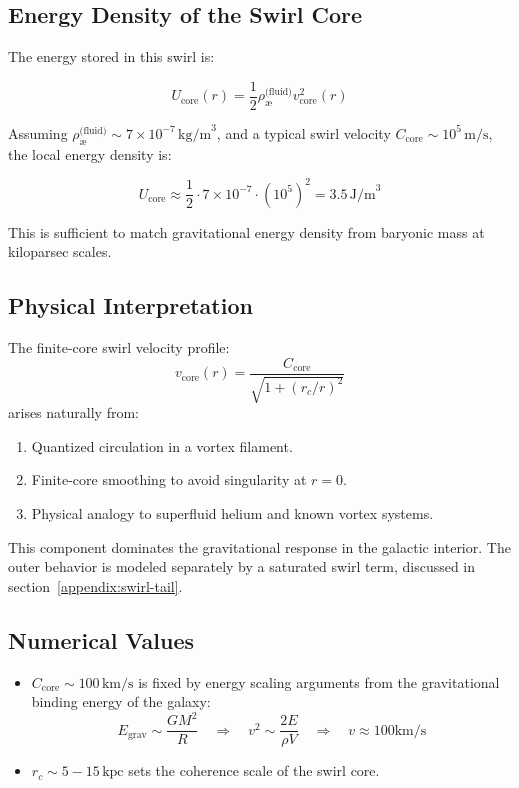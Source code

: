 \documentclass[12pt]{article}
\begin{document}
\subsection{Energy Density of the Swirl Core}

The energy stored in this swirl is:

\[
U_{\text{core}}(r) = \frac{1}{2} \rho_{\text{\ae}}^{\text{(fluid)}} v_\text{core}^2(r)
\]

Assuming \( \rho_{\text{\ae}}^{\text{(fluid)}} \sim 7 \times 10^{-7}\, \text{kg/m}^3 \), and a typical swirl velocity \( C_{\text{core}} \sim 10^5\, \text{m/s} \), the local energy density is:

\[
U_{\text{core}} \approx \frac{1}{2} \cdot 7 \times 10^{-7} \cdot (10^5)^2 = 3.5\, \text{J/m}^3
\]

This is sufficient to match gravitational energy density from baryonic mass at kiloparsec scales.

\subsection{Physical Interpretation}

The finite-core swirl velocity profile:
\[
\boxed{
v_\text{core}(r) = \frac{C_{\text{core}}}{\sqrt{1 + (r_c/r)^2}}
}
\]
arises naturally from:
\begin{enumerate}
    \item Quantized circulation in a vortex filament.
    \item Finite-core smoothing to avoid singularity at \( r = 0 \).
    \item Physical analogy to superfluid helium and known vortex systems.
\end{enumerate}

This component dominates the gravitational response in the galactic interior. The outer behavior is modeled separately by a saturated swirl term, discussed in section~\ref{appendix:swirl-tail}.

\subsection{Numerical Values}

\begin{itemize}
    \item \( C_{\text{core}} \sim 100\,\text{km/s} \) is fixed by energy scaling arguments from the gravitational binding energy of the galaxy:
    \[
    E_{\text{grav}} \sim \frac{GM^2}{R} \quad \Rightarrow \quad v^2 \sim \frac{2E}{\rho V} \quad \Rightarrow \quad v \approx 100 \text{km/s}
    \]
    \item \( r_c \sim 5 - 15\,\text{kpc} \) sets the coherence scale of the swirl core.
\end{itemize}
\end{document}
